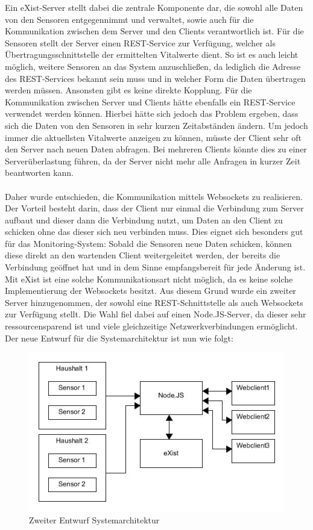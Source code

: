 Ein eXist-Server stellt dabei die zentrale Komponente dar, die sowohl alle Daten von den Sensoren entgegennimmt und verwaltet, sowie auch für die Kommunikation zwischen dem Server und den Clients verantwortlich ist. Für die Sensoren stellt der Server einen REST-Service zur Verfügung, welcher als Übertragungsschnittstelle der ermittelten Vitalwerte dient. So ist es auch leicht möglich, weitere Sensoren an das System anzuschließen, da lediglich die Adresse des REST-Services bekannt sein muss und in welcher Form die Daten übertragen werden müssen. Ansonsten gibt es keine direkte Kopplung. Für die Kommunikation zwischen Server und Clients hätte ebenfalls ein REST-Service verwendet werden können. Hierbei hätte sich jedoch das Problem ergeben, dass sich die Daten von den Sensoren in sehr kurzen Zeitabständen ändern. Um jedoch immer die aktuellsten Vitalwerte anzeigen zu können, müsste der Client sehr oft den Server nach neuen Daten abfragen. Bei mehreren Clients könnte dies zu einer Serverüberlastung führen, da der Server nicht mehr alle Anfragen in kurzer Zeit beantworten kann.
\\
\\
Daher wurde entschieden, die Kommunikation mittels Websockets zu realisieren. Der Vorteil besteht darin, dass der Client nur einmal die Verbindung zum Server aufbaut und dieser dann die Verbindung nutzt, um Daten an den Client zu schicken ohne das dieser sich neu verbinden muss. Dies eignet sich besonders gut für das Monitoring-System: Sobald die Sensoren neue Daten schicken, können diese direkt an den wartenden Client weitergeleitet werden, der bereits die Verbindung geöffnet hat und in dem Sinne empfangsbereit für jede Änderung ist. Mit eXist ist eine solche Kommunikationsart nicht möglich, da es keine solche Implementierung der Websockets besitzt. Aus diesem Grund wurde ein zweiter Server hinzugenommen, der sowohl eine REST-Schnittstelle als auch Websockets zur Verfügung stellt. Die Wahl fiel dabei auf einen Node.JS-Server, da dieser sehr ressourcensparend ist und viele gleichzeitige Netzwerkverbindungen ermöglicht. Der neue Entwurf für die Systemarchitektur ist nun wie folgt:

\begin{figure}[h]
\begin{center}
\includegraphics[scale=0.7]{images/sa2.jpg} 
\caption{Zweiter Entwurf Systemarchitektur}
\end{center}
\end{figure}

